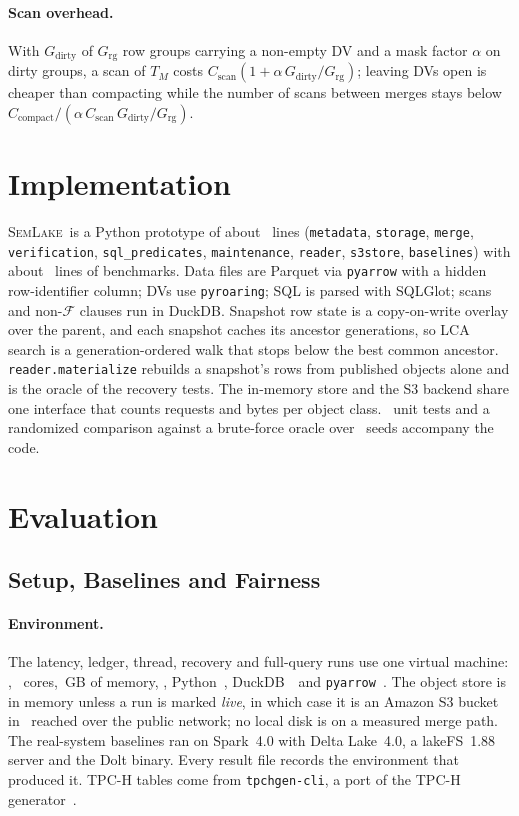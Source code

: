 \documentclass[sigconf, nonacm]{acmart}
\newcommand{\systemname}{\textsc{SemLake}}
\begin{document}
\paragraph{Scan overhead.} With $G_{\text{dirty}}$ of $G_{\text{rg}}$ row groups carrying a non-empty DV and a mask factor $\alpha$ on dirty groups, a scan of $T_M$ costs $C_{\text{scan}} (1 + \alpha\, G_{\text{dirty}} / G_{\text{rg}})$; leaving DVs open is cheaper than compacting while the number of scans between merges stays below $C_{\text{compact}} / (\alpha\, C_{\text{scan}}\, G_{\text{dirty}} / G_{\text{rg}})$.

\section{Implementation}
\label{sec:impl}

\systemname\ is a Python prototype of about \EngineLines\ lines (\texttt{metadata}, \texttt{storage}, \texttt{merge}, \texttt{verification}, \texttt{sql\_predicates}, \texttt{maintenance}, \texttt{reader}, \texttt{s3store}, \texttt{baselines}) with about \BenchLines\ lines of benchmarks. Data files are Parquet via \texttt{pyarrow} with a hidden row-identifier column; DVs use \texttt{pyroaring}; SQL is parsed with SQLGlot; scans and non-$\mathcal{F}$ clauses run in DuckDB. Snapshot row state is a copy-on-write overlay over the parent, and each snapshot caches its ancestor generations, so LCA search is a generation-ordered walk that stops below the best common ancestor. \texttt{reader.materialize} rebuilds a snapshot's rows from published objects alone and is the oracle of the recovery tests. The in-memory store and the S3 backend share one interface that counts requests and bytes per object class. \RevTests\ unit tests and a randomized comparison against a brute-force oracle over \FuzzSeeds\ seeds accompany the code.

\section{Evaluation}
\label{sec:eval}

\subsection{Setup, Baselines and Fairness}
\label{sec:eval_setup}

\paragraph{Environment.} The latency, ledger, thread, recovery and full-query runs use one virtual machine: \EnvCpu, \EnvCores\ cores, \EnvMemGB\,GB of memory, \EnvOs, Python~\EnvPython, DuckDB~\EnvDuckdb\ and \texttt{pyarrow}~\EnvPyarrow. The object store is in memory unless a run is marked \emph{live}, in which case it is an Amazon S3 bucket in \SthreeRegion\ reached over the public network; no local disk is on a measured merge path. The real-system baselines ran on Spark~4.0 with Delta Lake~4.0, a lakeFS~1.88 server and the Dolt binary. Every result file records the environment that produced it. TPC-H tables come from \texttt{tpchgen-cli}, a port of the TPC-H generator~\cite{tpch}.
\end{document}
